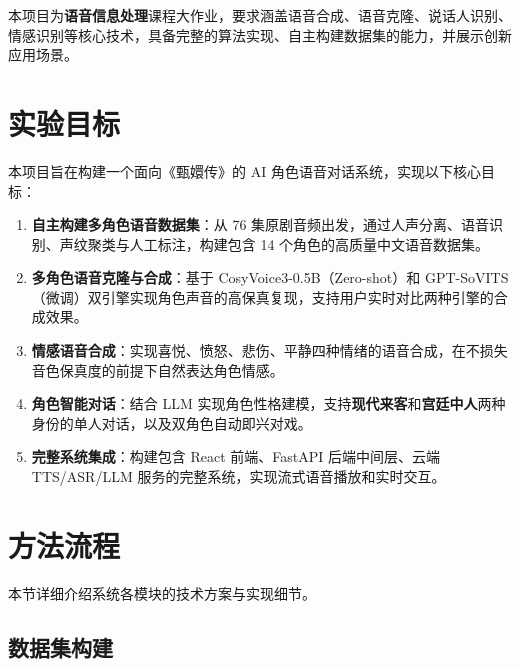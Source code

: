 \documentclass[12pt,a4paper]{article}
\begin{document}
本项目为\textbf{语音信息处理}课程大作业，要求涵盖语音合成、语音克隆、说话人识别、情感识别等核心技术，具备完整的算法实现、自主构建数据集的能力，并展示创新应用场景。

\section{实验目标}
\label{sec:objectives}

本项目旨在构建一个面向《甄嬛传》的 AI 角色语音对话系统，实现以下核心目标：

\begin{enumerate}[leftmargin=*]
    \item \textbf{自主构建多角色语音数据集}：从 76 集原剧音频出发，通过人声分离、语音识别、声纹聚类与人工标注，构建包含 14 个角色的高质量中文语音数据集。
    \item \textbf{多角色语音克隆与合成}：基于 CosyVoice3-0.5B（Zero-shot）和 GPT-SoVITS（微调）双引擎实现角色声音的高保真复现，支持用户实时对比两种引擎的合成效果。
    \item \textbf{情感语音合成}：实现喜悦、愤怒、悲伤、平静四种情绪的语音合成，在不损失音色保真度的前提下自然表达角色情感。
    \item \textbf{角色智能对话}：结合 LLM 实现角色性格建模，支持\textbf{现代来客}和\textbf{宫廷中人}两种身份的单人对话，以及双角色自动即兴对戏。
    \item \textbf{完整系统集成}：构建包含 React 前端、FastAPI 后端中间层、云端 TTS/ASR/LLM 服务的完整系统，实现流式语音播放和实时交互。
\end{enumerate}

\section{方法流程}
\label{sec:methods}

本节详细介绍系统各模块的技术方案与实现细节。


\subsection{数据集构建}
\label{sec:data}
\end{document}
